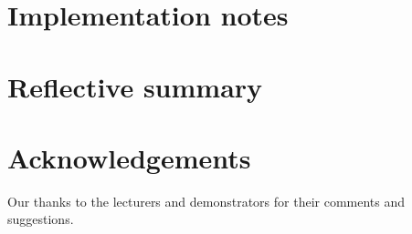 \documentclass{sig-alt-release2}
\begin{document}

\section{Implementation notes}



\section{Reflective summary}



\section{Acknowledgements}
Our thanks to the lecturers and demonstrators for their comments and suggestions.




%
\end{document}
